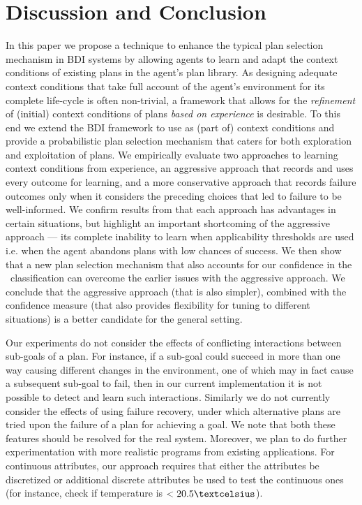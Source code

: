 \section{Discussion and Conclusion}\label{sec:discussion}

In this paper we propose a technique to enhance the typical plan selection mechanism in BDI systems by allowing agents to learn and adapt the context conditions of existing plans in the agent's plan library.
%
As designing adequate context conditions that take full account of the agent's environment for its complete life-cycle is often non-trivial, a framework that allows for the \emph{refinement} of (initial) context conditions of plans \textit{based on experience} is desirable. To this end we extend the BDI framework to use \dt\s as (part of) context conditions and provide a probabilistic plan selection mechanism that caters for both exploration and exploitation of plans.
%
We empirically evaluate two approaches to learning context conditions from experience, an aggressive approach that records and uses every outcome for learning, and a more conservative approach that records failure outcomes only when it considers the preceding choices that led to failure to be well-informed.
We confirm results from \cite{APSS08} that each approach has advantages in certain situations, but highlight an important shortcoming of the aggressive approach --- its complete inability to learn when applicability thresholds are used i.e. when the agent abandons plans with low chances of success. We then show that a new plan selection mechanism that also accounts for our confidence in the \dt\ classification can overcome the earlier issues with the aggressive approach. We conclude that the aggressive approach (that is also simpler), combined with the confidence measure (that also provides flexibility for tuning to different situations) is a better candidate for the general setting.

Our experiments do not consider the effects of conflicting interactions between sub-goals of a plan. For instance, if a sub-goal could succeed in more than one way causing different changes in the environment, one of which may in fact cause a subsequent sub-goal to fail, then in our current implementation it is not possible to detect and learn such interactions. Similarly we do not currently consider the effects of using failure recovery, under which alternative plans are tried upon the failure of a plan for achieving a goal. We note that both these features should be resolved for the real system. Moreover, we plan to do further experimentation with more realistic programs from existing applications. For continuous attributes, our approach requires that either the attributes be discretized or additional discrete attributes be used to test the continuous ones (for instance, check if temperature is $<20.5\textcelsius$).

